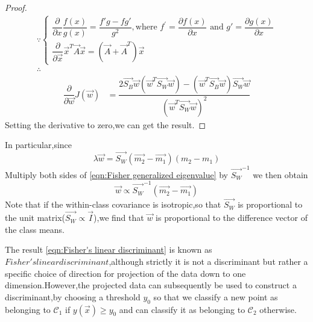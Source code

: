 \begin{proof}
\begin{eqnarray}\because\begin{cases}
	\dfrac{\partial}{\partial x}\dfrac{f(x)}{g(x)} 
	= \dfrac{f'g-fg'}{g^2}, \text{where } f^\prime 
	= \dfrac{\partial f(x)}{\partial x} \text{ and } g' 
	= \dfrac{\partial g(x)}{\partial x}	\\ 
	\dfrac{\partial}{\partial \vec{x}} \vec{x}^T\vec{A}\vec{x} = (\vec{A}+\vec{A}^T)\vec{x}
\end{cases}	\\
\therefore\end{eqnarray}
\begin{eqnarray}
\dfrac{\partial}{\partial \vec{w}}J(\vec{w}) & =  \dfrac{2\vec{S_B}\vec{w}(\vec{w}^T\vec{S_W}\vec{w})-(\vec{w}^T\vec{S_B}\vec{w})\vec{S_W}\vec{w}}{(\vec{w}^T\vec{S_W}\vec{w})^2}
\end{eqnarray}
Setting the derivative to zero,we can get the result.
\end{proof}
In particular,since 
\begin{equation}
\lambda\vec{w} = \vec{S_W}(\vec{m_2}-\vec{m_1})(m_2-m_1)
\end{equation}
Multiply both sides of \ref{eqn:Fisher generalized eigenvalue} by $\vec{S_W}^{-1}$ we then obtain
\begin{equation}\label{eqn:Fisher's linear discriminant}
\vec{w} \propto \vec{S_W}^{-1}(\vec{m_2}-\vec{m_1})
\end{equation}
Note that if the within-class covariance is isotropic,so that $\vec{S_W}$ is proportional to the unit matrix($\vec{S_W} \propto \vec{I}$),we find that $\vec{w}$ is proportional to the difference vector of the class means.

The result \ref{eqn:Fisher's linear discriminant} is known as $Fisher's linear discriminant$,although strictly it is not a discriminant but rather a specific choice of direction for projection of the data down to one dimension.However,the projected data can subsequently be used to construct a discriminant,by choosing a threshold $y_0$ so that we classify a new point as belonging to $\mathcal{C}_1$ if $y(\vec{x}) \geq y_0$ and can classify it as belonging to $\mathcal{C}_2$ otherwise.


